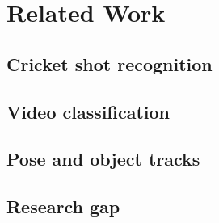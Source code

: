 \section{Related Work}\label{sec:related}


\subsection{Cricket shot recognition}

\subsection{Video classification}

\subsection{Pose and object tracks}

\subsection{Research gap}
